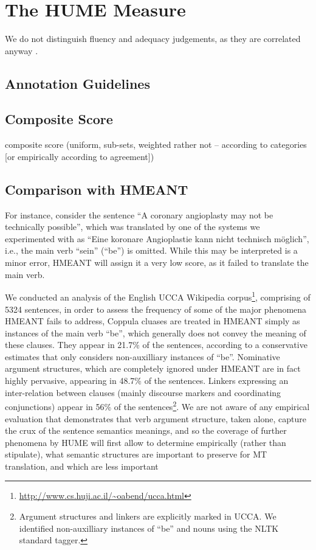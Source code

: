 \documentclass[11pt]{article}
\begin{document}
\section{The HUME Measure}\label{sec:hume}

We do not distinguish fluency and adequacy judgements, as they are correlated anyway \cite{ccb}.

\subsection{Annotation Guidelines}\label{sec:guidelines}


\subsection{Composite Score}\label{sec:score}

composite score (uniform, sub-sets, weighted rather not -- according to categories [or empirically according to agreement])


\subsection{Comparison with HMEANT}\label{sec:hmeant_comp}

For instance, consider the sentence ``A coronary angioplasty may not be technically possible'',
which was translated by one of the systems we experimented with as
``Eine koronare Angioplastie kann nicht technisch m{\"o}glich'', i.e., the main verb ``sein'' (``be'') is omitted.
While this may be interpreted is a minor error, HMEANT will assign it a very low score, as it failed to
translate the main verb. 

We conducted an analysis of the English UCCA Wikipedia
corpus\footnote{\url{http://www.cs.huji.ac.il/~oabend/ucca.html}}, comprising
of 5324 sentences,
in order to assess the frequency of some of the major phenomena HMEANT fails to address,
Coppula cluases are treated in HMEANT simply as instances of the main verb ``be'', which
generally does not convey the meaning of these clauses. They appear in 21.7\% of the sentences,
according to a conservative estimates that only considers non-auxilliary instances of ``be''.
Nominative argument structures, which are completely ignored under HMEANT are in fact highly
pervasive, appearing in 48.7\% of the sentences. Linkers expressing an inter-relation between
clauses (mainly discourse markers and coordinating conjunctions) appear in 56\% of the
sentences\footnote{Argument structures and linkers are explicitly marked in UCCA. We identified
  non-auxilliary instances of ``be'' and nouns using the NLTK standard tagger.}.
We are not aware of any empirical evaluation that demonstrates that verb argument structure,
taken alone, capture the crux of the sentence semantics meanings, and so the coverage of
further phenomena by HUME will first allow to determine empirically
(rather than stipulate), what semantic structures are important
to preserve for MT translation, and which are less important
\end{document}
